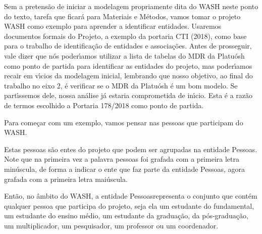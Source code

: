 \documentclass[
12pt,		%
openright,	%
twoside,  %
a4paper,			%
chapter=TITLE,		%
english,			%
french,				%
spanish,			%
brazil				%
]{USPSC-classe/USPSC}
\begin{document}
Sem a pretens\~ao de iniciar a modelagem propriamente dita do WASH neste ponto do texto, tarefa que ficar\'a para Materiais e M\'etodos, vamos tomar o projeto WASH como exemplo para aprender a identificar entidades. Usaremos documentos formais do Projeto, a exemplo da portaria CTI (2018), como base para o trabalho de identifica\c{c}\~ao de entidades e associa\c{c}\~oes. Antes de prosseguir, vale dizer que n\'os poder\'{\i}amos utilizar a lista de tabelas do MDR da Platu\'osh como ponto de partida para identificar as entidades do projeto, mas poder\'{\i}amos recair em v\'{\i}cios da modelagem inicial, lembrando que nosso objetivo, ao final do trabalho no eixo 2, \'e verificar se o MDR da Platu\'osh \'e um bom modelo. Se part\'{\i}ssemos dele, nossa an\'alise j\'a estaria comprometida de in\'{\i}cio. Esta \'e a raz\~ao de termos escolhido a Portaria 178/2018 como ponto de partida.














Para come\c{c}ar com um exemplo, vamos pensar nas \textquotedbl pessoas que participam do WASH\textquotedbl .














Estas pessoas s\~ao entes do projeto que podem ser agrupadas na entidade \textquotedbl Pessoas\textquotedbl . Note que na primeira vez a palavra pessoas foi grafada com a primeira letra min\'uscula, de forma a indicar o ente que faz parte da entidade \textquotedbl Pessoas\textquotedbl , agora grafada com a primeira letra mai\'uscula.














Ent\~ao, no \^ambito do WASH, a entidade \textquotedbl Pessoas\textquotedbl  representa o conjunto que cont\'em qualquer pessoa que participa do projeto, seja ela um estudante do fundamental, um estudante do ensino m\'edio, um estudante da gradua\c{c}\~ao, da p\'os-gradua\c{c}\~ao, um multiplicador, um pesquisador, um professor ou um coordenador.
\end{document}
